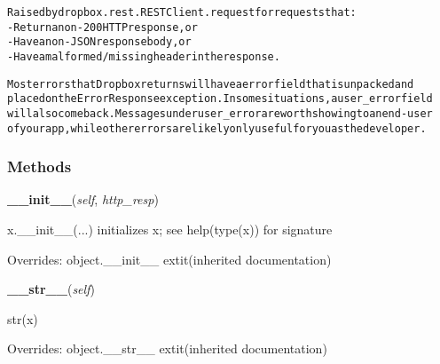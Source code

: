 \begin{alltt}

Raised by dropbox.rest.RESTClient.request for requests that:
- Return a non-200 HTTP response, or
- Have a non-JSON response body, or
- Have a malformed/missing header in the response.

Most errors that Dropbox returns will have a error field that is unpacked and
placed on the ErrorResponse exception. In some situations, a user\_error field
will also come back. Messages under user\_error are worth showing to an end-user
of your app, while other errors are likely only useful for you as the developer.
\end{alltt}



  \subsubsection{Methods}

    \vspace{0.5ex}

\hspace{.8\funcindent}\begin{boxedminipage}{\funcwidth}

    \raggedright \textbf{\_\_init\_\_}(\textit{self}, \textit{http\_resp})

\setlength{\parskip}{2ex}
    x.\_\_init\_\_(...) initializes x; see help(type(x)) for signature

\setlength{\parskip}{1ex}
      Overrides: object.\_\_init\_\_ 	extit{(inherited documentation)}

    \end{boxedminipage}

    \vspace{0.5ex}

\hspace{.8\funcindent}\begin{boxedminipage}{\funcwidth}

    \raggedright \textbf{\_\_str\_\_}(\textit{self})

\setlength{\parskip}{2ex}
    str(x)

\setlength{\parskip}{1ex}
      Overrides: object.\_\_str\_\_ 	extit{(inherited documentation)}

    \end{boxedminipage}


